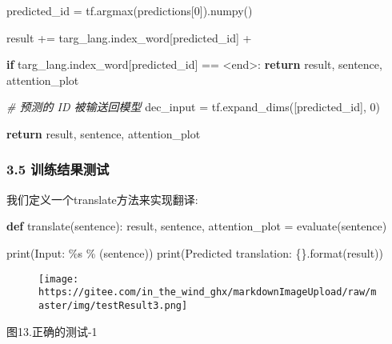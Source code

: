 \documentclass[
]{article}
\newenvironment{Shaded}{}{}
\newcommand{\BuiltInTok}[1]{#1}
\newcommand{\CommentTok}[1]{\textcolor[rgb]{0.38,0.63,0.69}{\textit{#1}}}
\newcommand{\ControlFlowTok}[1]{\textcolor[rgb]{0.00,0.44,0.13}{\textbf{#1}}}
\newcommand{\DecValTok}[1]{\textcolor[rgb]{0.25,0.63,0.44}{#1}}
\newcommand{\KeywordTok}[1]{\textcolor[rgb]{0.00,0.44,0.13}{\textbf{#1}}}
\newcommand{\NormalTok}[1]{#1}
\newcommand{\OperatorTok}[1]{\textcolor[rgb]{0.40,0.40,0.40}{#1}}
\newcommand{\SpecialCharTok}[1]{\textcolor[rgb]{0.25,0.44,0.63}{#1}}
\newcommand{\StringTok}[1]{\textcolor[rgb]{0.25,0.44,0.63}{#1}}
\begin{document}
\begin{Shaded}
\begin{Highlighting}[]
\NormalTok{        predicted\_id }\OperatorTok{=}\NormalTok{ tf.argmax(predictions[}\DecValTok{0}\NormalTok{]).numpy()}

\NormalTok{        result }\OperatorTok{+=}\NormalTok{ targ\_lang.index\_word[predicted\_id] }\OperatorTok{+} \StringTok{\textquotesingle{} \textquotesingle{}}

        \ControlFlowTok{if}\NormalTok{ targ\_lang.index\_word[predicted\_id] }\OperatorTok{==} \StringTok{\textquotesingle{}\textless{}end\textgreater{}\textquotesingle{}}\NormalTok{:}
            \ControlFlowTok{return}\NormalTok{ result, sentence, attention\_plot}

        \CommentTok{\# 预测的 ID 被输送回模型}
\NormalTok{        dec\_input }\OperatorTok{=}\NormalTok{ tf.expand\_dims([predicted\_id], }\DecValTok{0}\NormalTok{)}

    \ControlFlowTok{return}\NormalTok{ result, sentence, attention\_plot}
\end{Highlighting}
\end{Shaded}

\hypertarget{header-n152}{%
\subsubsection{3.5 训练结果测试}\label{header-n152}}

我们定义一个translate方法来实现翻译:

\begin{Shaded}
\begin{Highlighting}[]
\KeywordTok{def}\NormalTok{ translate(sentence):}
\NormalTok{    result, sentence, attention\_plot }\OperatorTok{=}\NormalTok{ evaluate(sentence)}

    \BuiltInTok{print}\NormalTok{(}\StringTok{\textquotesingle{}Input: }\SpecialCharTok{\%s}\StringTok{\textquotesingle{}} \OperatorTok{\%}\NormalTok{ (sentence))}
    \BuiltInTok{print}\NormalTok{(}\StringTok{\textquotesingle{}Predicted translation: }\SpecialCharTok{\{\}}\StringTok{\textquotesingle{}}\NormalTok{.}\BuiltInTok{format}\NormalTok{(result))}
\end{Highlighting}
\end{Shaded}

\begin{figure}
\centering
\texttt{[image: https://gitee.com/in\_the\_wind\_ghx/markdownImageUpload/raw/master/img/testResult3.png]}
\caption{}
\end{figure}

图13.正确的测试-1
\end{document}
